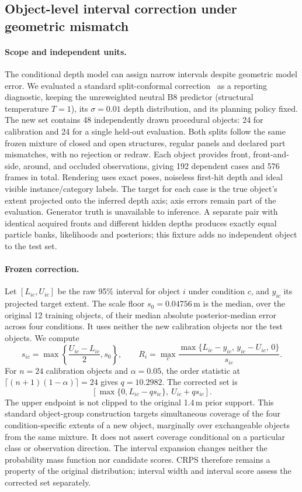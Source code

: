 \subsection{Object-level interval correction under geometric mismatch}
\label{supp:object-conformal}

\paragraph{Scope and independent units.}
The conditional depth model can assign narrow intervals despite geometric model error. We evaluated a standard split-conformal correction~\cite{Angelopoulos_2023} as a reporting diagnostic, keeping the unreweighted neutral B8 predictor (structural temperature $T=1$), its $\sigma=0.01$ depth distribution, and its planning policy fixed. The new set contains 48 independently drawn procedural objects: 24 for calibration and 24 for a single held-out evaluation. Both splits follow the same frozen mixture of closed and open structures, regular panels and declared part mismatches, with no rejection or redraw. Each object provides front, front-and-side, around, and occluded observations, giving 192 dependent cases and 576 frames in total. Rendering uses exact poses, noiseless first-hit depth and ideal visible instance/category labels. The target for each case is the true object's extent projected onto the inferred depth axis; axis errors remain part of the evaluation. Generator truth is unavailable to inference. A separate pair with identical acquired fronts and different hidden depths produces exactly equal particle banks, likelihoods and posteriors; this fixture adds no independent object to the test set.

\paragraph{Frozen correction.}
Let $[L_{ic},U_{ic}]$ be the raw 95\% interval for object $i$ under condition $c$, and $y_{ic}$ its projected target extent. The scale floor $s_0=0.04756$\,m is the median, over the original 12 training objects, of their median absolute posterior-median error across four conditions. It uses neither the new calibration objects nor the test objects. We compute
\[
s_{ic}=\max\!\left\{\frac{U_{ic}-L_{ic}}{2},s_0\right\},\qquad
R_i=\max_c\frac{\max\{L_{ic}-y_{ic},\,y_{ic}-U_{ic},\,0\}}{s_{ic}}.
\]
For $n=24$ calibration objects and $\alpha=0.05$, the order statistic at $\lceil(n+1)(1-\alpha)\rceil=24$ gives $q=10.2982$. The corrected set is
\[
\left[\max\{0,L_{ic}-q s_{ic}\},\ U_{ic}+q s_{ic}\right].
\]
The upper endpoint is not clipped to the original 1.4\,m prior support. This standard object-group construction targets simultaneous coverage of the four condition-specific extents of a new object, marginally over exchangeable objects from the same mixture. It does not assert coverage conditional on a particular class or observation direction. The interval expansion changes neither the probability mass function nor candidate scores. CRPS therefore remains a property of the original distribution; interval width and interval score assess the corrected set separately.

